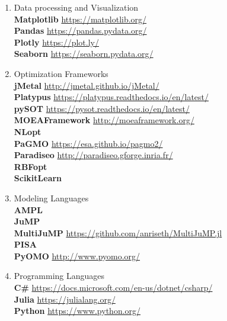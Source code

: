 \begin{enumerate}[label=\Alph*]
\item Data processing and Visualization \\
\textbf{Matplotlib} \url{https://matplotlib.org/} \\
\textbf{Pandas} \url{https://pandas.pydata.org/} \\
\textbf{Plotly} \url{https://plot.ly/} \\
\textbf{Seaborn} \url{https://seaborn.pydata.org/}

\item Optimization Frameworks\\
\textbf{jMetal} \url{http://jmetal.github.io/jMetal/} \\
\textbf{Platypus} \url{https://platypus.readthedocs.io/en/latest/} \\
\textbf{pySOT} \url{https://pysot.readthedocs.io/en/latest/} \\
\textbf{MOEAFramework} \url{http://moeaframework.org/} \\
\textbf{NLopt} \cite{NLOPT} \\
\textbf{PaGMO} \url{https://esa.github.io/pagmo2/} \\
\textbf{Paradiseo} \url{http://paradiseo.gforge.inria.fr/} \\
\textbf{RBFopt} \cite{RBFOPT} \\ 
\textbf{ScikitLearn} \cite{scikit-learn} 

\item Modeling Languages  \\
\textbf{AMPL} \cite{AMPL} \\
\textbf{JuMP} \cite{DunningHuchetteLubin2017} \\
\textbf{MultiJuMP} \url{https://github.com/anriseth/MultiJuMP.jl} \\
\textbf{PISA} \cite{PISA2003} \\
\textbf{PyOMO} \url{http://www.pyomo.org/}

\item Programming Languages \\
\textbf{C\#} \url{https://docs.microsoft.com/en-us/dotnet/csharp/} \\
\textbf{Julia} \url{https://julialang.org/} \\
\textbf{Python} \url{https://www.python.org/}

\end{enumerate}